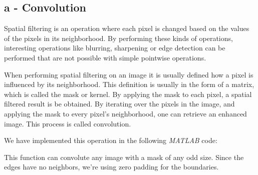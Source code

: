 \subsection*{a - Convolution}
Spatial filtering is an operation where each pixel is changed based on the values of the pixels in its neighborhood.
By performing these kinds of operations, interesting operations like blurring, sharpening or edge detection can be performed that are not possible with simple pointwise operations.

When performing spatial filtering on an image it is usually defined how a pixel is influenced by its neighborhood.
This definition is usually in the form of a matrix, which is called the mask or kernel.
By applying the mask to each pixel, a spatial filtered result is be obtained.
By iterating over the pixels in the image, and applying the mask to every pixel's neighborhood, one can retrieve an enhanced image.
This process is called convolution.

We have implemented this operation in the following \textit{MATLAB} code: 


This function can convolute any image with a mask of any odd size.
Since the edges have no neighbors, we're using zero padding for the boundaries.

